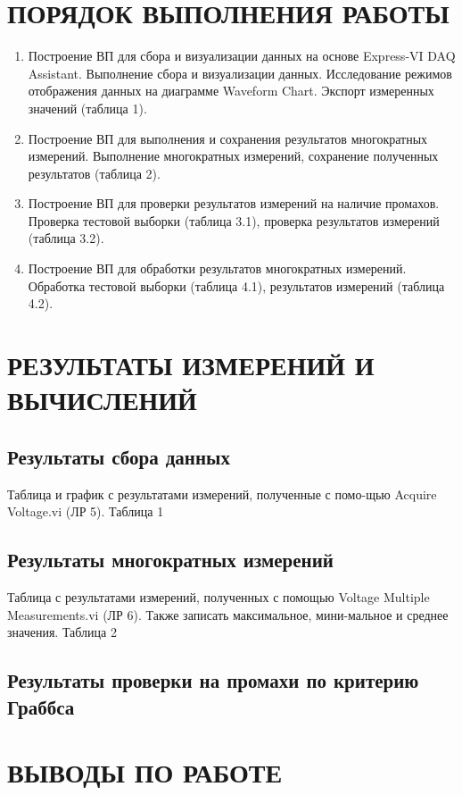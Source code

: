 \documentclass[a4paper,14pt]{article}
\begin{document}
\section{ПОРЯДОК ВЫПОЛНЕНИЯ РАБОТЫ}
\begin{enumerate}
\item 	Построение ВП для сбора и визуализации данных на основе Express-VI DAQ Assistant.
 Выполнение сбора и визуализации данных. 
 Исследование режимов отображения данных на диаграмме Waveform Chart. 
 Экспорт измеренных значений (таблица 1).
\item 	Построение ВП для выполнения и сохранения результатов многократных измерений.
 Выполнение многократных измерений, сохранение полученных результатов (таблица 2).
\item 	Построение ВП для проверки результатов измерений на наличие промахов. 
Проверка тестовой выборки (таблица 3.1), проверка результатов измерений (таблица  3.2).
\item 	Построение ВП для обработки результатов многократных измерений. 
Обработка тестовой выборки (таблица 4.1), результатов измерений (таблица 4.2).
\end{enumerate}

\section{ РЕЗУЛЬТАТЫ ИЗМЕРЕНИЙ И ВЫЧИСЛЕНИЙ}

\subsection{Результаты сбора данных}
Таблица и график с результатами измерений, полученные с помо-щью Acquire Voltage.vi (ЛР 5). 
Таблица 1
\subsection{Результаты многократных измерений}

Таблица с результатами измерений, полученных с помощью Voltage Multiple Measurements.vi (ЛР 6). Также записать максимальное, мини-мальное и среднее значения. 
Таблица 2
\subsection{Результаты проверки на промахи по критерию Граббса}

\section{ВЫВОДЫ ПО РАБОТЕ}
\end{document}
